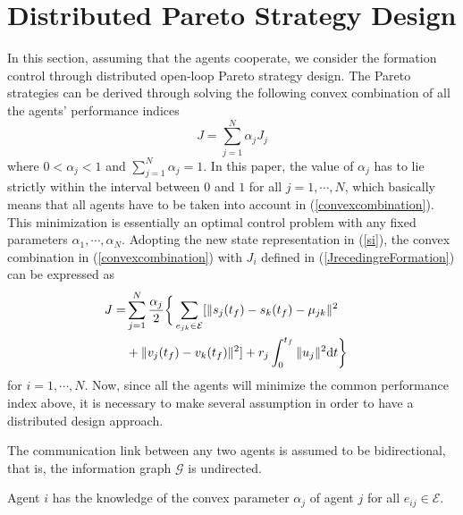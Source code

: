 \documentclass[letterpaper, 10 pt, conference,onecolumn]{ieeeconf}  %
\begin{document}
\section{Distributed Pareto Strategy Design}\label{mainresult2}
In this section, assuming that the agents {cooperate}, we consider the formation control through distributed open-loop Pareto strategy design. The Pareto strategies can be derived through solving the following convex combination of all the agents' performance indices
\begin{equation}
J=\sum^N_{j=1}\alpha_jJ_j\label{convexcombination}
\end{equation}
where $0< \alpha_j< 1$ and $\sum^N_{j=1}\alpha_j=1$. {In this paper, the value of $\alpha_j$ has to lie strictly within the interval between $0$ and $1$ for all $j=1,\cdots,N$, which basically means that all agents have to be taken into account in (\ref{convexcombination}).} This minimization is essentially an optimal control problem with any fixed parameters $\alpha_1,\cdots,\alpha_N$. Adopting the new state representation in (\ref{si}), the convex combination in (\ref{convexcombination}) with $J_i$ defined in (\ref{JrecedingreFormation}) can be expressed as
\begin{align}
J=&\sum^N_{j=1}
\frac{\alpha_j}{2}\bigg\{\sum_{e_{jk}\in\mathcal{E}} [\|s_{j}(t_f)-s_{k}(t_f)-\mu_{jk}\|^2\notag\\
&+ \|v_{j}(t_f)-v_{k}(t_f)\|^2]+r_j \int^{t_f}_0 \|u_j\|^2 \mbox{d}t\bigg\}
\quad
\label{Jrecedingre}
\end{align}
for $i=1,\cdots,N$. Now, since all the agents will minimize the common performance index above, it is necessary to make several assumption in order to have a distributed design approach.
\begin{Asu}
The communication link between any two agents is assumed to be bidirectional, that is, the information graph $\mathcal{G}$ is undirected.
\end{Asu}
\begin{Asu}
Agent $i$ has the knowledge of the convex parameter $\alpha_j$ of agent $j$ for all $e_{ij}\in\mathcal{E}$.
\end{Asu}
\end{document}

